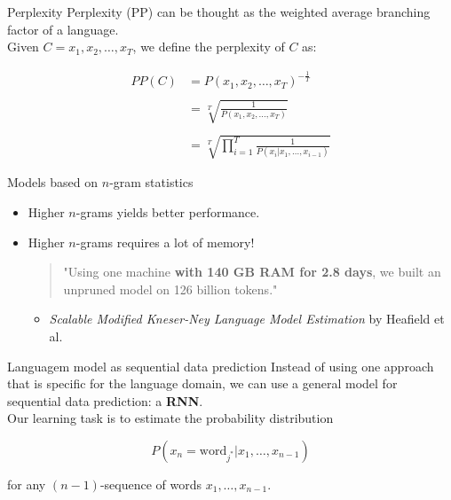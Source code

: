 \documentclass[10pt]{beamer}
\begin{document}
\begin{frame}{Perplexity}
\alert{Perplexity (PP)} can be thought as the weighted average branching factor of a language.\\


Given $C= x_1, x_2, \dots, x_T$, we define the perplexity of $C$ as:

\begin{align*}
PP(C) &= P(x_1, x_2, \dots, x_T)^{-\frac{1}{T}}\\
	  & \\
      &= \sqrt[T]{\frac{1}{P(x_1, x_2, \dots, x_T)}}\\
      & \\
      &= \sqrt[T]{\prod_{i=1}^{T}\frac{1}{P(x_i \vert x_1,\dots, x_{i-1})}}
\end{align*}
\end{frame}

\begin{frame}{Models based on $n$-gram statistics}
\begin{itemize}
\item Higher $n$-grams yields better performance.
\vspace{0.7cm}
\item Higher $n$-grams requires a lot of memory!
\vspace{0.1cm}
\begin{quote}
"Using one machine \textbf{with 140 GB
RAM for 2.8 days}, we built an unpruned
model on 126 billion tokens."
\end{quote}
\begin{itemize}
\item [] \textit{Scalable Modified Kneser-Ney Language Model Estimation} by Heafield et al.
\end{itemize}
\end{itemize}
\end{frame}



\begin{frame}{Languagem model as sequential data prediction}
Instead of using one approach that is specific for the language domain, we can use a general model for sequential data prediction: a \textbf{RNN}. \\

Our learning task is to estimate the probability distribution 

\[
P(x_{n} = \text{word}_{j^{*}} | x_{1}, \dots ,x_{n-1})
\]

for any $(n-1)$-sequence of words $x_{1}, \dots ,x_{n-1}$.
\end{frame}
\end{document}
